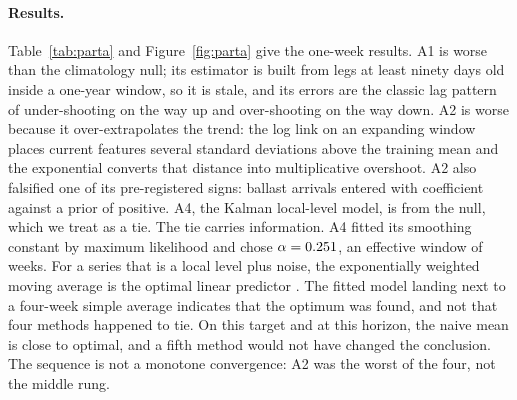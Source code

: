 \paragraph{Results.} Table~\ref{tab:parta} and Figure~\ref{fig:parta} give the
one-week results. A1 is \aOneSkill{} worse than the climatology null; its estimator
is built from legs at least ninety days old inside a one-year window, so it is
stale, and its errors are the classic lag pattern of under-shooting on the way up
and over-shooting on the way down. A2 is \aTwoSkill{} worse because it
over-extrapolates the trend: the log link on an expanding window places current
features several standard deviations above the training mean and the exponential
converts that distance into multiplicative overshoot. A2 also falsified one of its
pre-registered signs: ballast arrivals entered with coefficient \aTwoBallastCoef{}
against a prior of positive. A4, the Kalman local-level model, is \aFourSkill{}
from the null, which we treat as a tie. The tie carries information. A4 fitted its
smoothing constant by maximum likelihood and chose $\alpha=0.251$, an
effective window of \aFourWindow{} weeks. For a series that is a local level plus
noise, the exponentially weighted moving average is the optimal linear predictor
\citep{muth1960}. The fitted model landing next to a four-week simple average
indicates that the optimum was found, and not that four methods happened to tie. On
this target and at this horizon, the naive mean is close to optimal, and a fifth
method would not have changed the conclusion. The sequence is not a monotone
convergence: A2 was the worst of the four, not the middle rung.

